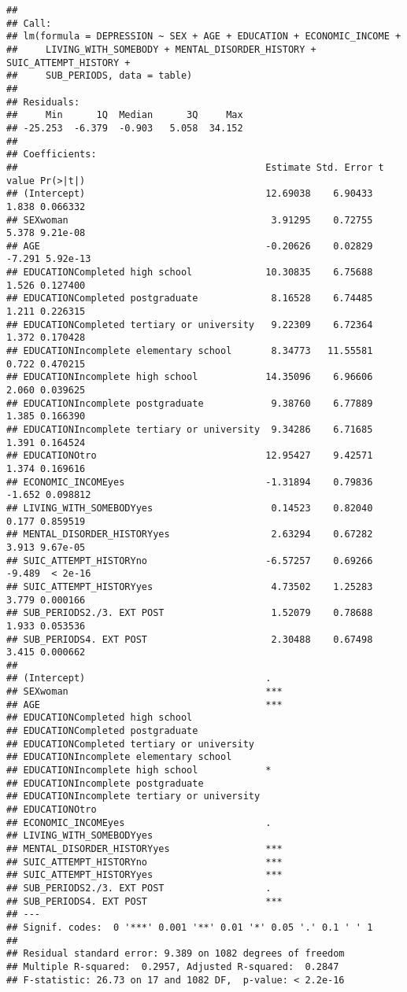 \documentclass[
]{book}
\begin{document}
\begin{verbatim}
## 
## Call:
## lm(formula = DEPRESSION ~ SEX + AGE + EDUCATION + ECONOMIC_INCOME + 
##     LIVING_WITH_SOMEBODY + MENTAL_DISORDER_HISTORY + SUIC_ATTEMPT_HISTORY + 
##     SUB_PERIODS, data = table)
## 
## Residuals:
##     Min      1Q  Median      3Q     Max 
## -25.253  -6.379  -0.903   5.058  34.152 
## 
## Coefficients:
##                                            Estimate Std. Error t value Pr(>|t|)
## (Intercept)                                12.69038    6.90433   1.838 0.066332
## SEXwoman                                    3.91295    0.72755   5.378 9.21e-08
## AGE                                        -0.20626    0.02829  -7.291 5.92e-13
## EDUCATIONCompleted high school             10.30835    6.75688   1.526 0.127400
## EDUCATIONCompleted postgraduate             8.16528    6.74485   1.211 0.226315
## EDUCATIONCompleted tertiary or university   9.22309    6.72364   1.372 0.170428
## EDUCATIONIncomplete elementary school       8.34773   11.55581   0.722 0.470215
## EDUCATIONIncomplete high school            14.35096    6.96606   2.060 0.039625
## EDUCATIONIncomplete postgraduate            9.38760    6.77889   1.385 0.166390
## EDUCATIONIncomplete tertiary or university  9.34286    6.71685   1.391 0.164524
## EDUCATIONOtro                              12.95427    9.42571   1.374 0.169616
## ECONOMIC_INCOMEyes                         -1.31894    0.79836  -1.652 0.098812
## LIVING_WITH_SOMEBODYyes                     0.14523    0.82040   0.177 0.859519
## MENTAL_DISORDER_HISTORYyes                  2.63294    0.67282   3.913 9.67e-05
## SUIC_ATTEMPT_HISTORYno                     -6.57257    0.69266  -9.489  < 2e-16
## SUIC_ATTEMPT_HISTORYyes                     4.73502    1.25283   3.779 0.000166
## SUB_PERIODS2./3. EXT POST                   1.52079    0.78688   1.933 0.053536
## SUB_PERIODS4. EXT POST                      2.30488    0.67498   3.415 0.000662
##                                               
## (Intercept)                                .  
## SEXwoman                                   ***
## AGE                                        ***
## EDUCATIONCompleted high school                
## EDUCATIONCompleted postgraduate               
## EDUCATIONCompleted tertiary or university     
## EDUCATIONIncomplete elementary school         
## EDUCATIONIncomplete high school            *  
## EDUCATIONIncomplete postgraduate              
## EDUCATIONIncomplete tertiary or university    
## EDUCATIONOtro                                 
## ECONOMIC_INCOMEyes                         .  
## LIVING_WITH_SOMEBODYyes                       
## MENTAL_DISORDER_HISTORYyes                 ***
## SUIC_ATTEMPT_HISTORYno                     ***
## SUIC_ATTEMPT_HISTORYyes                    ***
## SUB_PERIODS2./3. EXT POST                  .  
## SUB_PERIODS4. EXT POST                     ***
## ---
## Signif. codes:  0 '***' 0.001 '**' 0.01 '*' 0.05 '.' 0.1 ' ' 1
## 
## Residual standard error: 9.389 on 1082 degrees of freedom
## Multiple R-squared:  0.2957, Adjusted R-squared:  0.2847 
## F-statistic: 26.73 on 17 and 1082 DF,  p-value: < 2.2e-16
\end{verbatim}
\end{document}
